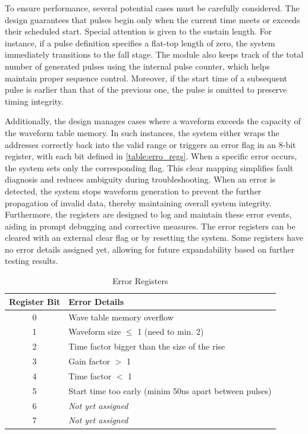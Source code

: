 To ensure performance, several potential cases must be carefully considered. The design guarantees that pulses begin only when the current time meets or exceeds their scheduled start. Special attention is given to the sustain length. For instance, if a pulse definition specifies a flat-top length of zero, the system immediately transitions to the fall stage. The module also keeps track of the total number of generated pulses using the internal pulse counter, which helps maintain proper sequence control. Moreover, if the start time of a subsequent pulse is earlier than that of the previous one, the pulse is omitted to preserve timing integrity.

Additionally, the design manages cases where a waveform exceeds the capacity of the waveform table memory. In such instances, the system either wraps the addresses correctly back into the valid range or triggers an error flag in an 8-bit register, with each bit defined in \autoref{table:erro_regs}. 
When a specific error occurs, the system sets only the corresponding flag. This clear mapping simplifies fault diagnosis and reduces ambiguity during troubleshooting. When an error is detected, the system stops waveform generation to prevent the further propagation of invalid data, thereby maintaining overall system integrity. Furthermore, the registers are designed to log and maintain these error events, aiding in prompt debugging and corrective measures. The error registers can be cleared with an external clear flag or by resetting the system. Some registers have no error details assigned yet, allowing for future expandability based on further testing results.
\begin{table}[h]
\setlength{\abovecaptionskip}{5pt}    %
\setlength{\belowcaptionskip}{5pt}    %
\centering
\caption{Error Registers}
\label{table:erro_regs}
\begin{tabular}{|c|l|}
\hline
Register Bit & Error Details \\
\hline
0 & Wave table memory overflow \\
\hline
1 & Waveform size $\leq$ 1 (need to min. 2) \\
\hline
2 & Time factor bigger than the size of the rise \\
\hline
3 & Gain factor $>$ 1 \\
\hline
4 & Time factor $<$ 1 \\
\hline
5 & Start time too early (minim 50ns apart between pulses) \\
\hline
6 & \textit{Not yet assigned} \\
\hline
7 & \textit{Not yet assigned} \\
\hline
\end{tabular}
\end{table}